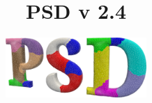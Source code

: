 \documentclass{report}
\title{\Huge \textbf{PSD v 2.4}}
\author{\includegraphics[width=0.4\textwidth]{./Images/logo.png}}
\begin{document}
    \maketitle
    
    \pagebreak
    \tableofcontents
    \pagebreak

    
    
    
    
    
    
    
        
    
    \pagebreak
    \printbibliography
\end{document}
